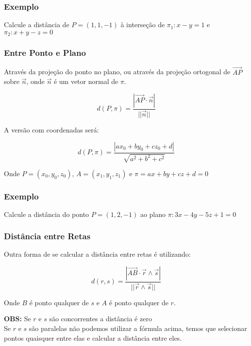 \documentclass[hyperref={pdfpagelabels=false}]{beamer}
\begin{document}
\begin{frame}
\frametitle{Exemplo}

Calcule a distância de $P = (1,1,-1)$ à interseção de $\pi_1: x-y=1$ e $\pi_2:x+y-z=0$

\end{frame}

\begin{frame}
\frametitle{Entre Ponto e Plano}

Através da projeção do ponto no plano, ou através da projeção ortogonal de $\overrightarrow{AP}$ sobre $\overrightarrow{n}$, onde $\overrightarrow{n}$ é um vetor normal de $\pi$.

\pause

$$d(P,\pi) = \frac{|\overrightarrow{AP}\cdot\overrightarrow{n}|}{||\overrightarrow{n}||}$$

A versão com coordenadas será:

$$d(P,\pi) = \frac{|ax_0 + by_0 + cz_0 + d|}{\sqrt{a^2 + b^2 + c^2}}$$

Onde $P = (x_0, y_0, z_0)$, $A = (x_1, y_1, z_1)$ e $\pi = ax + by + cz + d = 0$

\end{frame}

\begin{frame}
\frametitle{Exemplo}

Calcule a distância do ponto $P = (1,2,-1)$ ao plano $\pi : 3x - 4y -5z + 1 = 0$

\end{frame}


\begin{frame}
\frametitle{Distância entre Retas}

Outra forma de se calcular a distância entre retas é utilizando:

$$d(r,s) = \frac{|\overrightarrow{AB}\cdot \overrightarrow{r}\land \overrightarrow{s}|}{||\overrightarrow{r}\land \overrightarrow{s}||}$$

Onde $B$ é ponto qualquer de $s$ e $A$ é ponto qualquer de $r$.

\pause

{\bf OBS:} Se $r$ e $s$ são concorrentes a distância é zero
\\ 
Se $r$ e $s$ são paralelas não podemos utilizar a fórmula acima, temos que selecionar pontos quaisquer entre elas e calcular a distância entre eles.

\end{frame}
\end{document}
